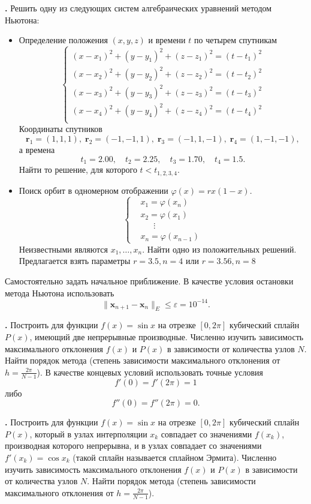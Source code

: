 \documentclass[12pt]{article}
\newcounter{task}
\newcommand{\problem}{\par\textbf{\stepcounter{task}\thetask. }}
\begin{document}
\problem Решить одну из следующих систем алгебраических уравнений методом Ньютона:
\begin{itemize}
\item Определение положения $(x,y,z)$ и времени $t$ по четырем спутникам
\[\left\{
\begin{aligned}
(x - x_1)^2 + (y - y_1)^2 + (z - z_1)^2 = (t - t_1)^2\\
(x - x_2)^2 + (y - y_2)^2 + (z - z_2)^2 = (t - t_2)^2\\
(x - x_3)^2 + (y - y_3)^2 + (z - z_3)^2 = (t - t_3)^2\\
(x - x_4)^2 + (y - y_4)^2 + (z - z_4)^2 = (t - t_4)^2\\
\end{aligned}
\right.
\]
Координаты спутников 
$$
\mathbf r_1 = (1, 1, 1), \;
\mathbf r_2 = (-1, -1, 1), \;
\mathbf r_3 = (-1, 1, -1), \;
\mathbf r_4 = (1, -1, -1),
$$
а времена 
$$
t_1 = 2.00, \quad t_2 = 2.25, \quad t_3 = 1.70, \quad t_4 = 1.5.
$$
Найти то решение, для которого $t < t_{1,2,3,4}$.
\item Поиск орбит в одномерном отображении $\varphi(x) = r x (1 - x)$. 
\[\left\{\begin{aligned}
&x_1 = \varphi(x_n)\\
&x_2 = \varphi(x_1)\\
&\;\;\quad\vdots\\
&x_n = \varphi(x_{n-1})
\end{aligned}
\right.\]
Неизвестными являются $x_1, \dots, x_n$. Найти одно из положительных решений. Предлагается взять параметры $r = 3.5, n = 4$ или $r = 3.56, n = 8$
\end{itemize}
Самостоятельно задать начальное приближение. В качестве условия остановки метода Ньютона использовать
$$
\|\mathbf x_{n+1} - \mathbf x_{n}\|_E \leqslant \varepsilon = 10^{-14}.
$$

\problem Построить для функции $f(x) = \sin x$ на отрезке $[0, 2\pi]$ кубический
сплайн $P(x)$, имеющий две непрерывные производные. Численно изучить зависимость
максимального отклонения $f(x)$ и $P(x)$ в зависимости от количества узлов $N$.
Найти порядок метода (степень зависимости максимального отклонения от
$h = \frac{2\pi}{N - 1}$). В качестве концевых условий использовать точные
условия
\[
f'(0) = f'(2\pi) = 1
\]
либо
\[
f''(0) = f''(2\pi) = 0.
\]

\problem Построить для функции $f(x) = \sin x$ на отрезке $[0, 2\pi]$ кубический
сплайн $P(x)$, который в узлах интерполяции $x_k$ совпадает со значениями $f(x_k)$,
производная которого непрерывна, и в узлах совпадает со значениями $f'(x_k) =
\cos x_k$ (такой сплайн называется сплайном Эрмита). Численно изучить зависимость
максимального отклонения $f(x)$ и $P(x)$ в зависимости от количества узлов $N$.
Найти порядок метода (степень зависимости максимального отклонения от
$h = \frac{2\pi}{N - 1}$).
\end{document}

